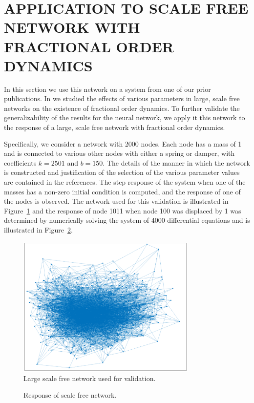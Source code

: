 \section{APPLICATION TO SCALE FREE NETWORK WITH FRACTIONAL ORDER DYNAMICS}
\label{sec:scalefree}

In this section we use this network on a system from one of our prior
publications.  In \cite{goodwinemed2023,goodwinemmar2023} we studied the effects
of various parameters in large, scale free networks on the existence of
fractional order dynamics. To further validate the generalizability of the
results for the neural network, we apply it this network to the response of a
large, scale free network with fractional order dynamics. 

Specifically, we consider a network with 2000 nodes. Each node has a mass of 1
and is connected to various other nodes with either a spring or damper, with
coefficients $k = 2501$ and $b = 150$. The details of the manner in which the
network is constructed and justification of the selection of the various
parameter values are contained in the references.  The step response of the
system when one of the masses has a non-zero initial condition is computed, and
the response of one of the nodes is observed. The network used for this
validation is illustrated in Figure~\ref{fig:network} and the response of node
1011 when node 100 was displaced by 1 was determined by numerically solving the
system of 4000 differential equations and is illustrated in
Figure~\ref{fig:sfresp}.

\begin{figure}
\centering
\includegraphics[width=3.5in]{network}
\caption{Large scale free network used for validation.}
\label{fig:network}
\end{figure}

\begin{figure}
\centering

\vspace*{-5pt}
\caption{Response of scale free network.}
\label{fig:sfresp}
\end{figure}


